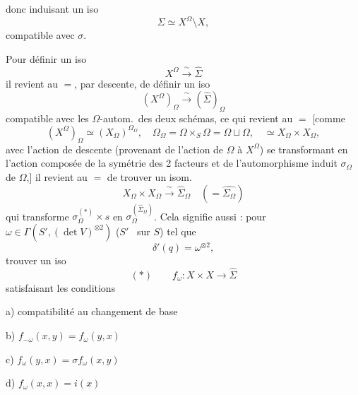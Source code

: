 \documentclass[11pt,a4paper]{article}
\begin{document}

donc induisant un iso
\[
  \Sigma \simeq X^{\Omega} \setminus X,
\]
compatible avec $\sigma$.

Pour définir un iso
\[
  X^{\Omega} \xrightarrow{\ \sim\ } \hat{\Sigma}
\]
il revient au $=$, par descente, de définir un iso
\[
  (X^{\Omega})_{\Omega} \xrightarrow{\ \sim\ } (\hat{\Sigma})_{\Omega}
\]
compatible avec les $\Omega$-autom.\ des deux schémas, ce qui revient au $=$ [comme
\[
  (X^{\Omega})_{\Omega} \simeq (X_{\Omega})^{\Omega_{\Omega}}, \quad
  \Omega_{\Omega} = \Omega \times_{S} \Omega = \Omega \sqcup \Omega,
  \quad \simeq X_{\Omega} \times X_{\Omega},
\]
avec l'action de descente (provenant de l'action de $\Omega$ à $X^{\Omega}$) se transformant en l'action composée de la symétrie des 2 facteurs et de l'automorphisme induit $\sigma_{\Omega}$ de $\Omega$,] il revient au $=$ de trouver un isom.
\[
  X_{\Omega} \times X_{\Omega} \xrightarrow{\ \sim\ } \hat{\Sigma}_{\Omega} \quad (= \widehat{\Sigma_{\Omega}})
\]
qui transforme $\sigma_{\Omega}^{(\ast)} \times s$ en $\sigma_{\Omega}^{(\hat{\Sigma}_{\Omega})}$.
Cela signifie aussi : pour $\omega \in \Gamma(S', (\det V)^{\otimes 2})$ \ill{} ($S'$ \ sur $S$) tel que
\[
  \delta'(q) = \omega^{\otimes 2},
\]
trouver un iso
\[
  (\ast) \qquad f_{\omega} : X \times X \longrightarrow \hat{\Sigma}
\]
\struck{\ill{}} satisfaisant les conditions

a) compatibilité au changement de base  \struck{\ill{}}

b) $f_{-\omega}(x,y) = f_{\omega}(y,x)$

c) $f_{\omega}(y,x) = \sigma f_{\omega}(x,y)$

d) $f_{\omega}(x,x) = i(x)$
\end{document}
